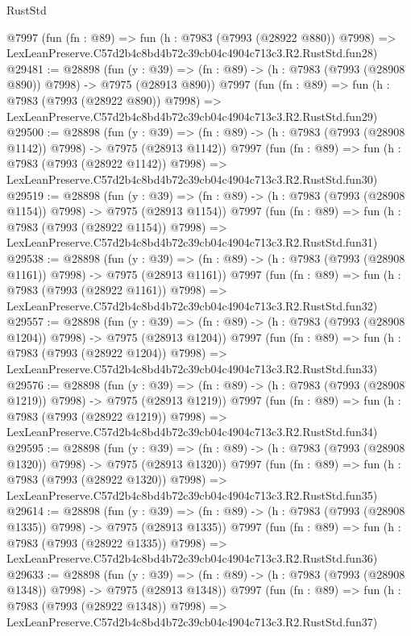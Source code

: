 \begin{lexlean}{RustStd}
\begin{coremodule}
    @7997
    (fun (fn : @89) =>
    fun (h : @7983 (@7993 (@28922 @880)) @7998) =>
    LexLeanPreserve.C57d2b4c8bd4b72c39cb04c4904c713c3.R2.RustStd.fun28)
@29481 := @28898
    (fun (y : @39) => (fn : @89) -> (h : @7983 (@7993 (@28908 @890)) @7998) -> @7975 (@28913 @890))
    @7997
    (fun (fn : @89) =>
    fun (h : @7983 (@7993 (@28922 @890)) @7998) =>
    LexLeanPreserve.C57d2b4c8bd4b72c39cb04c4904c713c3.R2.RustStd.fun29)
@29500 := @28898
    (fun (y : @39) =>
    (fn : @89) -> (h : @7983 (@7993 (@28908 @1142)) @7998) -> @7975 (@28913 @1142))
    @7997
    (fun (fn : @89) =>
    fun (h : @7983 (@7993 (@28922 @1142)) @7998) =>
    LexLeanPreserve.C57d2b4c8bd4b72c39cb04c4904c713c3.R2.RustStd.fun30)
@29519 := @28898
    (fun (y : @39) =>
    (fn : @89) -> (h : @7983 (@7993 (@28908 @1154)) @7998) -> @7975 (@28913 @1154))
    @7997
    (fun (fn : @89) =>
    fun (h : @7983 (@7993 (@28922 @1154)) @7998) =>
    LexLeanPreserve.C57d2b4c8bd4b72c39cb04c4904c713c3.R2.RustStd.fun31)
@29538 := @28898
    (fun (y : @39) =>
    (fn : @89) -> (h : @7983 (@7993 (@28908 @1161)) @7998) -> @7975 (@28913 @1161))
    @7997
    (fun (fn : @89) =>
    fun (h : @7983 (@7993 (@28922 @1161)) @7998) =>
    LexLeanPreserve.C57d2b4c8bd4b72c39cb04c4904c713c3.R2.RustStd.fun32)
@29557 := @28898
    (fun (y : @39) =>
    (fn : @89) -> (h : @7983 (@7993 (@28908 @1204)) @7998) -> @7975 (@28913 @1204))
    @7997
    (fun (fn : @89) =>
    fun (h : @7983 (@7993 (@28922 @1204)) @7998) =>
    LexLeanPreserve.C57d2b4c8bd4b72c39cb04c4904c713c3.R2.RustStd.fun33)
@29576 := @28898
    (fun (y : @39) =>
    (fn : @89) -> (h : @7983 (@7993 (@28908 @1219)) @7998) -> @7975 (@28913 @1219))
    @7997
    (fun (fn : @89) =>
    fun (h : @7983 (@7993 (@28922 @1219)) @7998) =>
    LexLeanPreserve.C57d2b4c8bd4b72c39cb04c4904c713c3.R2.RustStd.fun34)
@29595 := @28898
    (fun (y : @39) =>
    (fn : @89) -> (h : @7983 (@7993 (@28908 @1320)) @7998) -> @7975 (@28913 @1320))
    @7997
    (fun (fn : @89) =>
    fun (h : @7983 (@7993 (@28922 @1320)) @7998) =>
    LexLeanPreserve.C57d2b4c8bd4b72c39cb04c4904c713c3.R2.RustStd.fun35)
@29614 := @28898
    (fun (y : @39) =>
    (fn : @89) -> (h : @7983 (@7993 (@28908 @1335)) @7998) -> @7975 (@28913 @1335))
    @7997
    (fun (fn : @89) =>
    fun (h : @7983 (@7993 (@28922 @1335)) @7998) =>
    LexLeanPreserve.C57d2b4c8bd4b72c39cb04c4904c713c3.R2.RustStd.fun36)
@29633 := @28898
    (fun (y : @39) =>
    (fn : @89) -> (h : @7983 (@7993 (@28908 @1348)) @7998) -> @7975 (@28913 @1348))
    @7997
    (fun (fn : @89) =>
    fun (h : @7983 (@7993 (@28922 @1348)) @7998) =>
    LexLeanPreserve.C57d2b4c8bd4b72c39cb04c4904c713c3.R2.RustStd.fun37)

\end{coremodule}
\end{lexlean}
